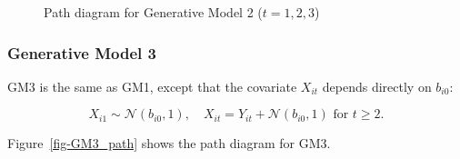 \documentclass[
  12pt,
  a4paper,
]{article}
\begin{document}
\begin{figure}[H]

\caption{\label{fig-GM2_path}Path diagram for Generative Model 2
(\(t = 1, 2, 3\))}


\end{figure}%

\subsubsection{Generative Model 3}\label{generative-model-3}

GM3 is the same as GM1, except that the covariate \(X_{it}\) depends
directly on \(b_{i0}\):

\[
X_{i1} \sim \mathcal{N}(b_{i0}, 1), \quad X_{it} = Y_{it} + \mathcal{N}(b_{i0}, 1) \text{ for } t \geq 2.
\]

Figure~\ref{fig-GM3_path} shows the path diagram for GM3.
\end{document}
